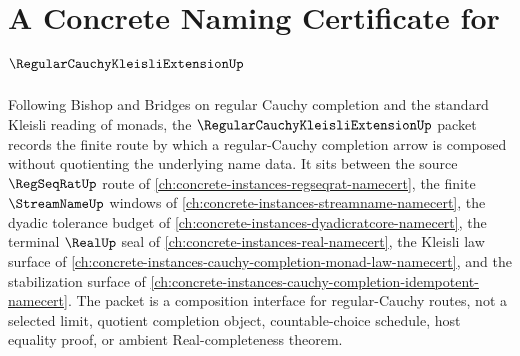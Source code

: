 \chapter{A Concrete Naming Certificate for $\RegularCauchyKleisliExtensionUp$}
\label{ch:concrete-instances-regular-cauchy-kleisli-extension-namecert}

Following Bishop and Bridges on regular Cauchy completion and the standard Kleisli reading of monads, the $\RegularCauchyKleisliExtensionUp$ packet records the finite route by which a regular-Cauchy completion arrow is composed without quotienting the underlying name data. It sits between the source $\RegSeqRatUp$ route of \autoref{ch:concrete-instances-regseqrat-namecert}, the finite $\StreamNameUp$ windows of \autoref{ch:concrete-instances-streamname-namecert}, the dyadic tolerance budget of \autoref{ch:concrete-instances-dyadicratcore-namecert}, the terminal $\RealUp$ seal of \autoref{ch:concrete-instances-real-namecert}, the Kleisli law surface of \autoref{ch:concrete-instances-cauchy-completion-monad-law-namecert}, and the stabilization surface of \autoref{ch:concrete-instances-cauchy-completion-idempotent-namecert}. The packet is a composition interface for regular-Cauchy routes, not a selected limit, quotient completion object, countable-choice schedule, host equality proof, or ambient Real-completeness theorem.

